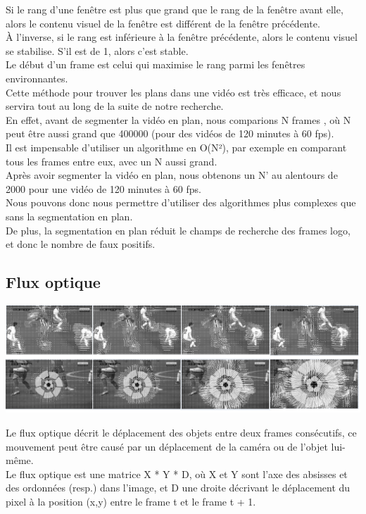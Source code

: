 \documentclass[11pt]{article}
\begin{document}
Si le rang d'une fenêtre est plus que grand que le rang de la fenêtre avant elle, alors le contenu visuel de la fenêtre est différent de la fenêtre précédente.\\
À l'inverse, si le rang est inférieure à la fenêtre précédente, alors le contenu visuel se stabilise. S'il est de 1, alors c'est stable.\\

Le début d'un frame est celui qui maximise le rang parmi les fenêtres environnantes.\\

Cette méthode pour trouver les plans dans une vidéo est très efficace, et nous servira tout au long de la suite de notre recherche.\\

En effet, avant de segmenter la vidéo en plan, nous comparions  N frames , où N peut être aussi grand que 400000 (pour des vidéos de 120 minutes à 60 fps).\\
Il est impensable d’utiliser un algorithme en O(N²), par exemple en comparant tous les frames entre eux, avec un N aussi grand.\\

Après avoir segmenter la vidéo en plan, nous obtenons un N’ au alentours de 2000 pour une vidéo de 120 minutes à 60 fps.\\
Nous pouvons donc nous permettre d’utiliser des algorithmes plus complexes que sans la segmentation en plan.\\
De plus, la segmentation en plan réduit le champs de recherche des frames logo, et donc le nombre de faux positifs.\\

\subsection{Flux optique}
\label{sec:org87cbcea}
\begin{center}
\includegraphics[width=.9\linewidth]{optical_flow_2.png}
\end{center}
Le flux optique décrit le déplacement des objets entre deux frames consécutifs, ce mouvement peut être causé par un déplacement de la caméra ou de l'objet lui-même.\\
Le flux optique est une matrice X * Y * D, où X et Y sont l'axe des absisses et des ordonnées (resp.) dans l'image, et D une droite décrivant le déplacement du pixel à la position (x,y) entre le frame t et le frame t + 1.\\
\end{document}
